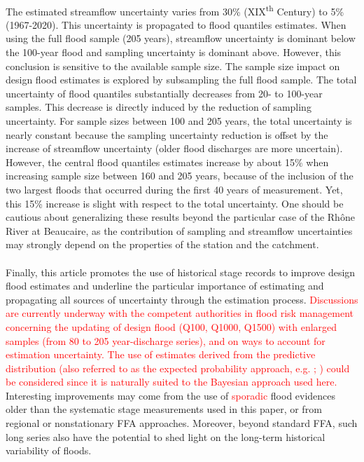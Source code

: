 \documentclass[11pt]{article}
\begin{document}
    \paragraph{} The estimated streamflow uncertainty varies from 30\% (XIX\textsuperscript{th} Century) to 5\% (1967-2020). This uncertainty is propagated to flood quantiles estimates. When using the full flood sample (205 years), streamflow uncertainty is dominant below the 100-year flood and sampling uncertainty is dominant above. However, this conclusion is sensitive to the available sample size. The sample size impact on design flood estimates is explored by subsampling the full flood sample.
    The total uncertainty of flood quantiles substantially decreases from 20- to 100-year samples. This decrease is directly induced by the reduction of sampling uncertainty. For sample sizes between 100 and 205 years, the total uncertainty is nearly constant because the sampling uncertainty reduction is offset by the increase of streamflow uncertainty (older flood discharges are more uncertain). However, the central flood quantiles estimates increase by about 15\% when increasing sample size between 160 and 205 years, because of the inclusion of the two largest floods that occurred during the first 40 years of measurement. Yet, this 15\% increase is slight with respect to the total uncertainty. One should be cautious about generalizing these results beyond the particular case of the Rhône River at Beaucaire, as the contribution of sampling and streamflow uncertainties may strongly depend on the properties of the station and the catchment.
    \paragraph{}
    Finally, this article promotes the use of historical stage records to improve design flood estimates and underline the particular importance of estimating and propagating all sources of uncertainty through the estimation process. \textcolor{red}{Discussions are currently underway with the competent authorities in flood risk management concerning the updating of design flood (Q100, Q1000, Q1500) with enlarged samples (from 80 to 205 year-discharge series), and on ways to account for estimation uncertainty. The use of estimates derived from the predictive distribution (also referred to as the expected probability approach, e.g. \cite{kuczera_comprehensive_1999}; \cite{renard_data-based_2013}) could be considered since it is naturally suited to the Bayesian approach used here.} Interesting improvements may come from the use of \textcolor{red}{sporadic} flood evidences older than the systematic stage measurements used in this paper, or from regional or nonstationary FFA approaches. Moreover, beyond standard FFA, such long series also have the potential to shed light on the long-term historical variability of floods. 
\end{document}
